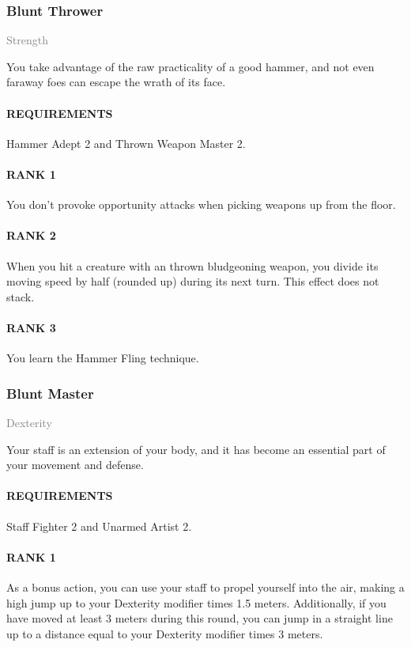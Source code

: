 \subsubsection{Blunt Thrower} \label{tal::bluntthrower}
\small{\textcolor{gray}{Strength}}

\normalsize
You take advantage of the raw practicality of a good hammer, and not even faraway foes can escape the wrath of its face.
\paragraph{REQUIREMENTS} Hammer Adept 2 and Thrown Weapon Master 2.
\paragraph{RANK 1} You don't provoke opportunity attacks when picking weapons up from the floor.
\paragraph{RANK 2} When you hit a creature with an thrown bludgeoning weapon, you divide its moving speed by half (rounded up) during its next turn.
This effect does not stack.
\paragraph{RANK 3} You learn the Hammer Fling technique.

\subsubsection{Blunt Master} \label{tal::bluntmaster}
\small{\textcolor{gray}{Dexterity}}

\normalsize
Your staff is an extension of your body, and it has become an essential part of your movement and defense.
\paragraph{REQUIREMENTS} Staff Fighter 2 and Unarmed Artist 2.
\paragraph{RANK 1} As a bonus action, you can use your staff to propel yourself into the air, making a high jump up to your Dexterity modifier times 1.5 meters.
Additionally, if you have moved at least 3 meters during this round, you can jump in a straight line up to a distance equal to your Dexterity modifier times 3 meters.
